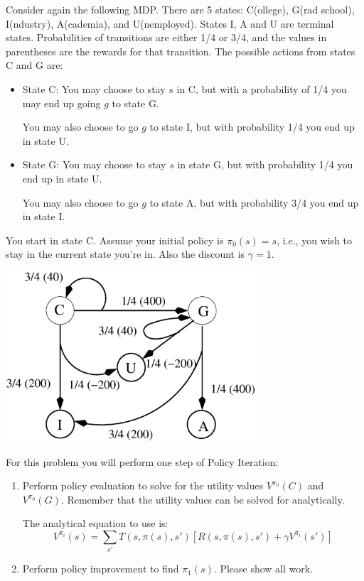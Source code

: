 \documentclass[12pt]{article}
\begin{document}
Consider again the following MDP.  There are 5 states: C(ollege),
G(rad school), I(ndustry), A(cademia), and U(nemployed).  States I, A
and U are terminal states.  Probabilities of transitions are either
1/4 or 3/4, and the values in parentheses are the rewards for that
transition.  The possible actions from states C and G are:

      \begin{itemize}

      \item State C: You may choose to stay $s$ in C, but with a
        probability of 1/4 you may end up going $g$ to state G.

        You may also choose to go $g$ to state I, but with probability 1/4
        you end up in state U.

      \item State G: You may choose to stay $s$ in state G, but with
        probability 1/4 you end up in state U.

        You may also choose to go $g$ to state A, but with probability 3/4
        you end up in state I.

      \end{itemize}

\noindent
You start in state C.  Assume your initial policy is $\pi_0(s) = s$,
i.e., you wish to stay in the current state you're in.  Also the
discount is $\gamma = 1$.

  \begin{center}
    \includegraphics[height=2.5in]{cgiau.eps}
  \end{center}

For this problem you will perform one step of Policy Iteration:
  \begin{enumerate}

  \item Perform policy evaluation to solve for the utility values
    $V^{\pi_0}(C)$ and $V^{\pi_0}(G)$.  Remember that the
    utility values can be solved for analytically.

    The analytical equation to use is:
  $$V^{\pi_i}(s) = \sum_{s'} T(s,\pi(s),s') \left[ R(s,\pi(s),s') + \gamma  V^{\pi_i}(s') \right]$$

  \item Perform policy improvement to find $\pi_1(s)$.  Please show
    all work.

  \end{enumerate}
\end{document}
